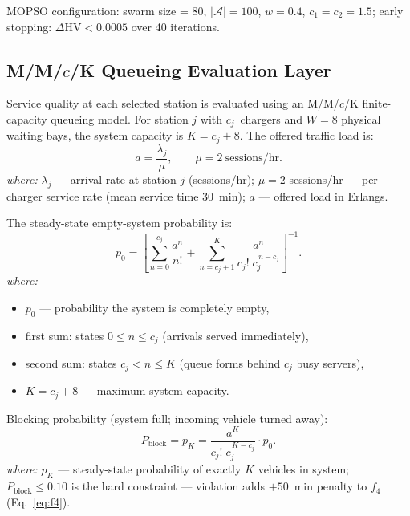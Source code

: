 \noindent
MOPSO configuration: swarm size = 80, $|\mathcal{A}| = 100$,
$w = 0.4$, $c_1 = c_2 = 1.5$; early stopping: $\Delta\mathrm{HV} <
0.0005$ over 40 iterations.

\subsection{M/M/$c$/K Queueing Evaluation Layer}
\label{sec:queue_layer}

Service quality at each selected station is evaluated using an
M/M/$c$/K finite-capacity queueing model. For station $j$ with
$c_j$~chargers and $W = 8$ physical waiting bays, the system capacity
is $K = c_j + 8$. The offered traffic load is:
\begin{equation}
a = \frac{\lambda_j}{\mu}, \qquad \mu = 2\ \text{sessions/hr.}
\label{eq:load}
\end{equation}
\textit{where:} $\lambda_j$ — arrival rate at station $j$ (sessions/hr);
$\mu = 2$ sessions/hr — per-charger service rate (mean service time
30~min); $a$ — offered load in Erlangs.

\medskip\noindent
The steady-state empty-system probability is:
\begin{equation}
p_0 =
\left[
\sum_{n=0}^{c_j} \frac{a^n}{n!}
+
\sum_{n=c_j+1}^{K} \frac{a^n}{c_j!\; c_j^{\,n-c_j}}
\right]^{-1}.
\label{eq:p0}
\end{equation}
\textit{where:}
\begin{itemize}
  \item $p_0$ — probability the system is completely empty,
  \item first sum: states $0 \le n \le c_j$ (arrivals served immediately),
  \item second sum: states $c_j < n \le K$ (queue forms behind $c_j$
        busy servers),
  \item $K = c_j + 8$ — maximum system capacity.
\end{itemize}

\medskip\noindent
Blocking probability (system full; incoming vehicle turned away):
\begin{equation}
P_{\mathrm{block}} = p_K
= \frac{a^K}{c_j!\; c_j^{\,K-c_j}} \cdot p_0.
\label{eq:pblock}
\end{equation}
\textit{where:} $p_K$ — steady-state probability of exactly $K$ vehicles
in system; $P_{\mathrm{block}} \leq 0.10$ is the hard constraint —
violation adds $+50$~min penalty to $f_4$ (Eq.~\eqref{eq:f4}).

